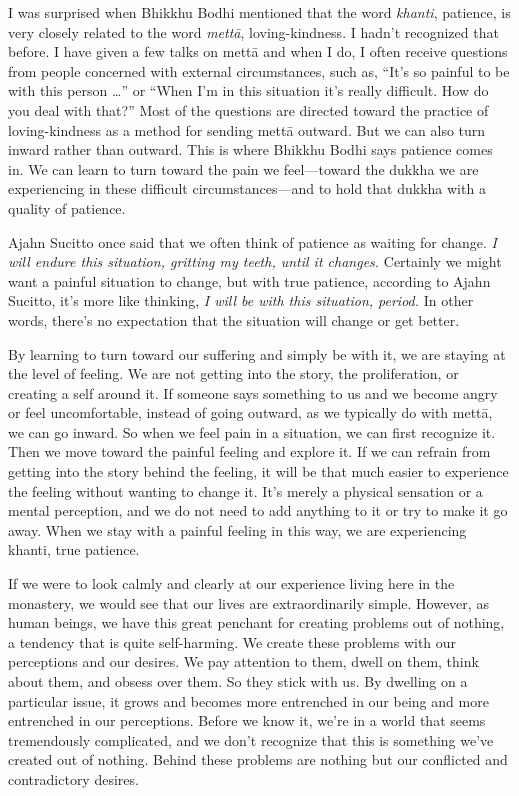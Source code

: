 I was surprised when Bhikkhu Bodhi mentioned that the word 
\emph{khanti}, patience, is very closely related to the word 
\emph{mettā}, loving-kindness. I hadn't recognized that before. I have 
given a few talks on mettā and when I do, I often receive questions 
from people concerned with external circumstances, such as, ``It's so 
painful to be with this person \ldots{}'' or ``When I'm in this 
situation it's really difficult. How do you deal with that?'' Most of 
the questions are directed toward the practice of loving-kindness as a 
method for sending mettā outward. But we can also turn inward rather 
than outward. This is where Bhikkhu Bodhi says patience comes in. We 
can learn to turn toward the pain we feel---toward the dukkha we are 
experiencing in these difficult circumstances---and to hold that dukkha 
with a quality of patience.

Ajahn Sucitto once said that we often think of patience as waiting for 
change. \emph{I will endure this situation, gritting my teeth, until it 
changes.} Certainly we might want a painful situation to change, but 
with true patience, according to Ajahn Sucitto, it's more like 
thinking, \emph{I will be with this situation, period.} In other words, 
there's no expectation that the situation will change or get better.

By learning to turn toward our suffering and simply be with it, we are 
staying at the level of feeling. We are not getting into the story, the 
proliferation, or creating a self around it. If someone says something 
to us and we become angry or feel uncomfortable, instead of going 
outward, as we typically do with mettā, we can go inward. So when we 
feel pain in a situation, we can first recognize it. Then we move 
toward the painful feeling and explore it. If we can refrain from 
getting into the story behind the feeling, it will be that much easier 
to experience the feeling without wanting to change it. It's merely a 
physical sensation or a mental perception, and we do not need to add 
anything to it or try to make it go away. When we stay with a painful 
feeling in this way, we are experiencing khanti, true patience.


If we were to look calmly and clearly at our experience living here in 
the monastery, we would see that our lives are extraordinarily simple. 
However, as human beings, we have this great penchant for creating 
problems out of nothing, a tendency that is quite self-harming. We 
create these problems with our perceptions and our desires. We pay 
attention to them, dwell on them, think about them, and obsess over 
them. So they stick with us. By dwelling on a particular issue, it 
grows and becomes more entrenched in our being and more entrenched in 
our perceptions. Before we know it, we're in a world that seems 
tremendously complicated, and we don't recognize that this is something 
we've created out of nothing. Behind these problems are nothing but our 
conflicted and contradictory desires.

